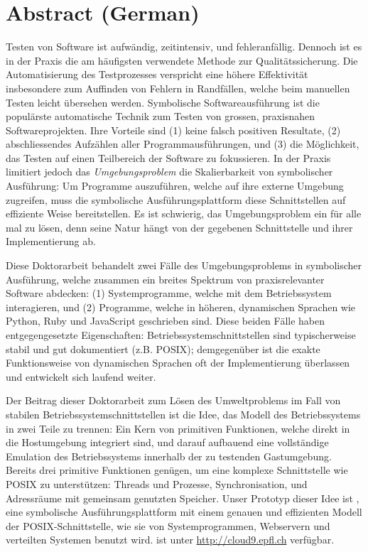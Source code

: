 \chapter*{Abstract (German)}

Testen von Software ist aufwändig, zeitintensiv, und fehleranfällig. Dennoch ist es in der Praxis die am häufigsten verwendete Methode zur Qualitätssicherung. Die Automatisierung des Testprozesses verspricht eine höhere Effektivität insbesondere zum Auffinden von Fehlern in Randfällen, welche beim manuellen Testen leicht übersehen werden. Symbolische Softwareausführung ist die populärste automatische Technik zum Testen von grossen, praxisnahen Softwareprojekten. Ihre Vorteile sind (1) keine falsch positiven Resultate, (2) abschliessendes Aufzählen aller Programmausführungen, und (3) die Möglichkeit, das Testen auf einen Teilbereich der Software zu fokussieren. In der Praxis limitiert jedoch das \emph{Umgebungsproblem} die Skalierbarkeit von symbolischer Ausführung: Um Programme auszuführen, welche auf ihre externe Umgebung zugreifen, muss die symbolische Ausführungsplattform diese Schnittstellen auf effiziente Weise bereitstellen. Es ist schwierig, das Umgebungsproblem ein für alle mal zu lösen, denn seine Natur hängt von der gegebenen Schnittstelle und ihrer Implementierung ab.

Diese Doktorarbeit behandelt zwei Fälle des Umgebungsproblems in symbolischer Ausführung, welche zusammen ein breites Spektrum von praxisrelevanter Software abdecken: (1) Systemprogramme, welche mit dem Betriebssystem interagieren, und (2) Programme, welche in höheren, dynamischen Sprachen wie Python, Ruby und JavaScript geschrieben sind. Diese beiden Fälle haben entgegengesetzte Eigenschaften: Betriebssystemschnittstellen sind typischerweise stabil und gut dokumentiert (z.B. POSIX); demgegenüber ist die exakte Funktionsweise von dynamischen Sprachen oft der Implementierung überlassen und entwickelt sich laufend weiter.

Der Beitrag dieser Doktorarbeit zum Lösen des Umweltproblems im Fall von stabilen Betriebssystemschnittstellen ist die Idee, das Modell des Betriebssystems in zwei Teile zu trennen: Ein Kern von primitiven Funktionen, welche direkt in die Hostumgebung integriert sind, und darauf aufbauend eine vollständige Emulation des Betriebssystems innerhalb der zu testenden Gastumgebung. Bereits drei primitive Funktionen genügen, um eine komplexe Schnittstelle wie POSIX zu unterstützen: Threads und Prozesse, Synchronisation, und Adressräume mit gemeinsam genutzten Speicher. Unser Prototyp dieser Idee ist \emph{\cnine}, eine symbolische Ausführungsplattform mit einem genauen und effizienten Modell der POSIX-Schnittstelle, wie sie von Systemprogrammen, Webservern und verteilten Systemen benutzt wird. \cnine ist unter {\url{http://cloud9.epfl.ch}} verfügbar.

